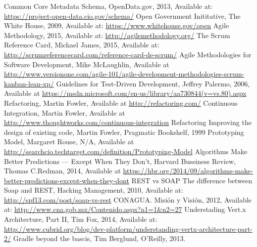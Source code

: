 \begin{thebibliography}{1}
    Common Core Metadata Schema, OpenData.gov, 2013, Available at: \url{https://project-open-data.cio.gov/schema/}
    Open Government Inititative, The White House, 2009, Available at: \url{https://www.whitehouse.gov/open}
    Agile Methodology, 2015, Available at: \url{http://agilemethodology.org/}
    The Scrum Reference Card, Michael James, 2015, Available at: \url{http://scrumreferencecard.com/reference-card-de-scrum/}
    Agile Methodologies for Software Development, Mike McLaughlin, Available at \url{http://www.versionone.com/agile-101/agile-development-methodologies-scrum-kanban-lean-xp/}
    Guidelines for Test-Driven Development, Jeffrey Palermo, 2006, Available at \url{https://msdn.microsoft.com/en-us/library/aa730844(v=vs.80).aspx}
    Refactoring, Martin Fowler, Available at \url{http://refactoring.com/}
    Continuous Integration, Martin Fowler, Available at \url{http://www.thoughtworks.com/continuous-integration}
     Refactoring \: Improving the design of existing code, Martin Fowler, Pragmatic Bookshelf, 1999
     Prototyping Model, Margaret Rouse, N/A, Available at \url{http://searchcio.techtarget.com/definition/Prototyping-Model}
    Algorithms Make Better Predictions — Except When They Don’t, Harvard Bussiness Review, Thomas C.Redman, 2014, Available at \url{https://hbr.org/2014/09/algorithms-make-better-predictions-except-when-they-dont}
    REST vs SOAP\: The difference between Soap and REST, Hacking Management, 2010, Available at: \url{http://spf13.com/post/soap-vs-rest}
    CONAGUA. Misión y Visión, 2012, Available at: \url{http://www.cna.gob.mx/Contenido.aspx?n1=1&n2=27}
    Understading Vert.x Architecture, Part II, Tim Fox, 2014, Available at: \url{http://www.cubrid.org/blog/dev-platform/understanding-vertx-architecture-part-2/}
    Gradle beyond the bascis, Tim Berglund, O'Reilly, 2013.
\end{thebibliography}

